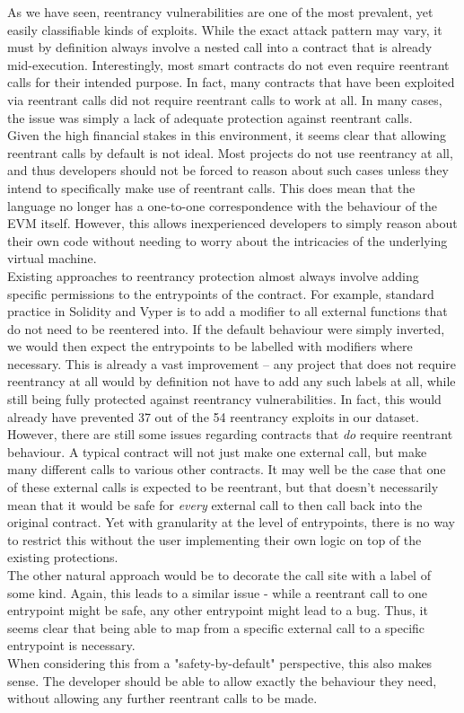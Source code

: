 As we have seen, reentrancy vulnerabilities are one of the most prevalent, yet easily classifiable kinds of exploits. While the exact attack pattern may vary, it must by definition always involve a nested call into a contract that is already mid-execution. Interestingly, most smart contracts do not even require reentrant calls for their intended purpose. In fact, many contracts that have been exploited via reentrant calls did not require reentrant calls to work at all. In many cases, the issue was simply a lack of adequate protection against reentrant calls. \\
Given the high financial stakes in this environment, it seems clear that allowing reentrant calls by default is not ideal. Most projects do not use reentrancy at all, and thus developers should not be forced to reason about such cases unless they intend to specifically make use of reentrant calls. This does mean that the language no longer has a one-to-one correspondence with the behaviour of the EVM itself. However, this allows inexperienced developers to simply reason about their own code without needing to worry about the intricacies of the underlying virtual machine. \\
Existing approaches to reentrancy protection almost always involve adding specific permissions to the entrypoints of the contract. For example, standard practice in Solidity and Vyper is to add a  modifier to all external functions that do not need to be reentered into. If the default behaviour were simply inverted, we would then expect the entrypoints to be labelled with  modifiers where necessary. This is already a vast improvement -- any project that does not require reentrancy at all would by definition not have to add any such labels at all, while still being fully protected against reentrancy vulnerabilities. In fact, this would already have prevented 37 out of the 54 reentrancy exploits in our dataset. \\
However, there are still some issues regarding contracts that \textit{do} require reentrant behaviour. A typical contract will not just make one external call, but make many different calls to various other contracts. It may well be the case that one of these external calls is expected to be reentrant, but that doesn't necessarily mean that it would be safe for \textit{every} external call to then call back into the original contract. Yet with granularity at the level of entrypoints, there is no way to restrict this without the user implementing their own logic on top of the existing protections. \\
The other natural approach would be to decorate the call site with a  label of some kind. Again, this leads to a similar issue - while a reentrant call to one entrypoint might be safe, any other entrypoint might lead to a bug. Thus, it seems clear that being able to map from a specific external call to a specific entrypoint is necessary. \\
When considering this from a "safety-by-default" perspective, this also makes sense. The developer should be able to allow exactly the behaviour they need, without allowing any further reentrant calls to be made.

